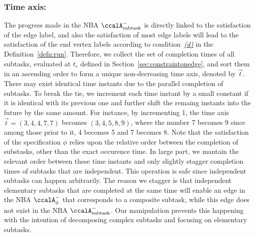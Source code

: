 \documentclass[Afour,sageh,times]{sagej}
\newcommand{\auto}[1]{\ccalA_{\textup{#1}}}
\newcommand{\autop}{\ccalA_{\phi}}
\begin{document}
{{{\subsubsection{Time axis:} The progress made in the NBA $\auto{subtask}^-$ is directly linked to the satisfaction of the edge label, and also the satisfaction of most edge labels  will lead to the satisfaction of the end vertex labels according to condition~\hyperref[cond:d]{\it (d)} in the Definition~\ref{defn:run}. Therefore, we collect the  set of completion times of all subtasks, evaluated at $t_e$ defined in Section~\ref{sec:constraintonedge}, and sort them in an ascending order to form a unique non-decreasing time axis, denoted by $\vec{t}$. There may exist identical time instants due to the parallel completion of subtasks. To break the tie, we increment each time instant by a small constant if it is identical with its previous one and further shift the remaing instants into the future by the same amount. For instance, by incrementing 1, the time axis $\vec{t}= (3, 4, 4, 7, 7)$ becomes $(3, 4, 5, 8, 9)$, where the number 7 becomes 9 since among those prior to it, 4 becomes 5 and 7 becomes 8.  Note that the satisfaction of  the specification $\phi$ relies upon the relative order between the completion of substasks, other than the exact occurence time. In large part, we mantain the relevant order between these time instants and only slightly stagger completion times of subtasks that are independent. This operation is safe since independent subtasks can happen arbitrarily. The reason we stagger is that independent elementary subtasks that are completed at the same time will enable an edge in the NBA $\autop^-$ that corresponds to a composite subtask, while this edge does not exist in the NBA $\auto{subtask}^-$. Our manipulation prevents this happening with the intention of decomposing complex subtasks and focusing on elementary subtasks.

}}}
\end{document}
